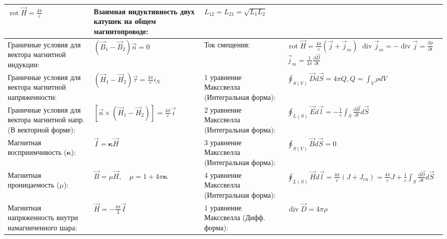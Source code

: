 \documentclass{article}
\begin{document}
\begin{tabular}{ |p{6cm}|p{3.5cm}|p{6cm}|p{3.5cm}|  }
$\operatorname{rot} \vec{H}=\frac{4 \pi}{c}$                               &
Взаимная индуктивность двух катушек на общем магнитопроводе:               &
$L_{12}=L_{21}=\sqrt{L_{1} L_{2}}$                                         \\
\hline
Граничные условия для вектора магнитной индукции:                          &
$\left(\vec{B}_{1}-\vec{B}_{2}\right) \vec{n}=0$                           &
Ток смещения:                                                              &
$\operatorname{rot} \vec{H}=\frac{4 \pi}{c}\left(\vec{j}+\vec{j}_{m}\right)$
$\operatorname{div} \vec{j}_{m}=-\operatorname{div} \vec{j}=\frac{\partial \rho}{\partial t}$
$\vec{j}_{m}=\frac{1}{4 \pi} \frac{\partial \vec{D}}{\partial t}$          \\
\hline
Граничные условия для вектора магнитной напряженности:                     &
$\left(\vec{H}_{1}-\vec{H}_{2}\right) \vec{\tau}= \frac{4 \pi}{c} i_{N}$   &
1 уравнение Макссвелла (Интегральная форма):                               &
$\oint_{S(V)} \vec{D} d \vec{S}=4 \pi Q, Q=\int_{V} \rho d V$              \\
\hline
Граничные условия для вектора магнитной напр. (В векторной форме):         &
$[\vec{n} \times \left(\vec{H}_{1}-\vec{H}_{2}\right)]=\frac{4 \pi}{c} \vec{i}$ &
2 уравнение Макссвелла (Интегральная форма):                               &
$\oint_{L(S)} \vec{E} d \vec{l}=-\frac{1}{c} \int_{S} \frac{\partial \vec{B}}{\partial t} d \vec{S}$\\
\hline
Магнитная восприимчивость ($\boldsymbol{\kappa}$):                         &
$\vec{I}=\boldsymbol{\kappa} \vec{H}$                                      &
3 уравнение Макссвелла (Интегральная форма):                               &
$\oint_{S(V)} \vec{B} d \vec{S}=0$                                         \\
\hline
Магнитная проницаемость ($\mu$):                                           &
$\vec{B}=\mu \vec{H}, \quad \mu=1+4 \pi \boldsymbol{\kappa}$               &
4 уравнение Макссвелла (Интегральная форма):                               &
$\oint_{L(S)} \vec{H} d \vec{l}=\frac{4 \pi}{c}\left(J+J_{\mathrm{cu}}\right)=\frac{4 \pi}{c} J+\frac{1}{c} \int_{S} \frac{\partial \vec{D}}{\partial t} d \vec{S}$\\
\hline
Магнитная напряженность внутри намагниченного шара:                        &
$\vec{H}=-\frac{4 \pi}{3} \vec{I}$                                         &
1 уравнение Макссвелла (Дифф. форма):                                      &
$\operatorname{div} \vec{D}=4 \pi \rho$                                    \\

\end{tabular}
\end{document}

